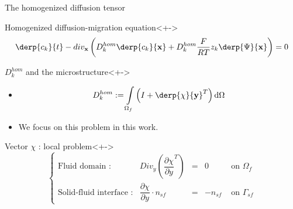 \begin{frame}{The homogenized diffusion tensor}
%
\begin{block}{Homogenized diffusion-migration equation}<+->
\[\derp{c_k}{t}-div_{\mathbf{x}}\left(D_k^{hom}\derp{c_k}{\mathbf{x}}+D_k^{hom}\frac{F}{RT}z_k \derp{\Psi}{\mathbf{x}}\right)=0\]
\end{block}
%
\begin{block}{$D_k^{hom}$ and the microstructure}<+->%
\begin{itemize}
\item<+-> \[D_k^{hom}:=\int\limits_{\Omega_f}\left(I+\derp{\chi}{\mathbf{y}}^T\right)\text{d}\Omega\]
\item<+-> We focus on this problem in this work.
\end{itemize}
\end{block}
%
\begin{block}{Vector $\chi$ : local problem}<+->
\[%
\left\{%
\begin{array}{llccr}
\text{Fluid domain :}&Div_y \left( \dfrac{\partial{\chi}}{\partial{y}}^T\right) &=& 0&\text{ on }\Omega_f \\
\text{Solid-fluid interface :}&\dfrac{\partial{\chi}}{\partial{y}} \cdot n_{sf}&=&-n_{sf}&\text{ on }\Gamma_{sf}
\end{array}
\right.
\]
\end{block}
%
\end{frame}

